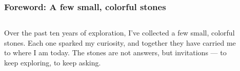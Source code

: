 \documentclass[aspectratio=169]{beamer}
\begin{document}
\begin{frame}
    \frametitle{Foreword: A few small, colorful stones}
        \begin{columns}
        \begin{column}{0.55\textwidth}
Over the past ten years of exploration, I’ve collected a few small, colorful stones.
\newline\newline
Each one sparked my curiosity, and together they have carried me to where I am today.
\newline\newline
The stones are not answers, but invitations — to keep exploring, to keep asking.
        \end{column}
        \begin{column}{0.45\textwidth}
            \begin{figure}[ht]\centering
            \end{figure}
        \end{column}
    \end{columns}

\end{frame}
\end{document}
